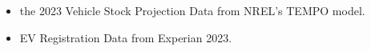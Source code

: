 \begin{itemize}
\item the 2023 Vehicle Stock Projection Data from NREL's TEMPO model.
\item EV Registration Data from Experian 2023.
\end{itemize}
